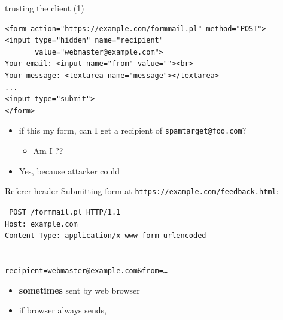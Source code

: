 \begin{frame}[fragile,label=trustCli1]{trusting the client (1)}
\begin{verbatim}
<form action="https://example.com/formmail.pl" method="POST">
<input type="hidden" name="recipient"
       value="webmaster@example.com">
Your email: <input name="from" value=""><br>
Your message: <textarea name="message"></textarea>
...
<input type="submit">
</form>
\end{verbatim}
    \begin{itemize}
        \item if this my form, can I get a recipient of \texttt{spamtarget@foo.com}?
            \begin{itemize}
                \item Am I ??
            \end{itemize}
        \item<2> Yes, because attacker could 
    \end{itemize}
\end{frame}
\begin{frame}[fragile,label=RefererHeader]{Referer header}
Submitting form at \texttt{https://example.com/feedback.html}:
\begin{framed}
\tt\small
POST /formmail.pl HTTP/1.1 \\
Host: example.com \\
Content-Type: application/x-www-form-urlencoded \\
 \\
~ \\
recipient=webmaster@example.com\&from=\ldots \\
\end{framed}
    \begin{itemize}
        \item \textbf{sometimes} sent by web browser
        \item if browser always sends, 
    \end{itemize}
\end{frame}

